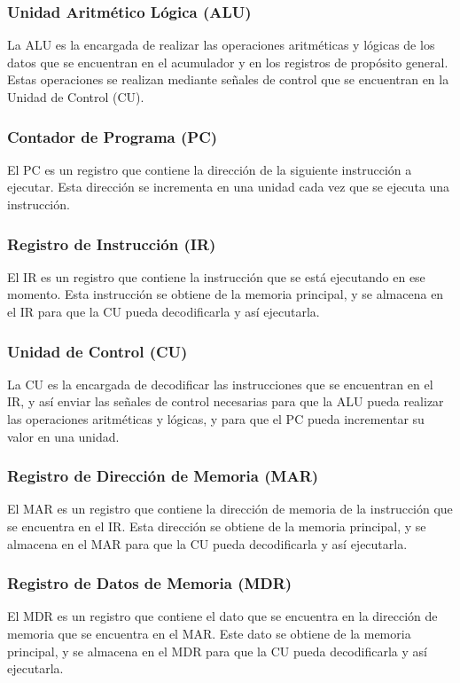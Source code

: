 \documentclass{article}
\begin{document}
\subsubsection*{Unidad Aritmético Lógica (ALU)}
La ALU es la encargada de realizar las operaciones aritm\'{e}ticas y l\'{o}gicas
de los datos que se encuentran en el acumulador y en los registros de prop\'{o}sito
general. Estas operaciones se realizan mediante se\~{n}ales de control que se
encuentran en la Unidad de Control (CU).

\subsubsection*{Contador de Programa (PC)}
El PC es un registro que contiene la direcci\'{o}n de la siguiente instrucci\'{o}n
a ejecutar. Esta direcci\'{o}n se incrementa en una unidad cada vez que se ejecuta
una instrucci\'{o}n.

\subsubsection*{Registro de Instrucción (IR)}
El IR es un registro que contiene la instrucci\'{o}n que se est\'{a} ejecutando en
ese momento. Esta instrucci\'{o}n se obtiene de la memoria principal, y se almacena
en el IR para que la CU pueda decodificarla y as\'{i} ejecutarla.

\subsubsection*{Unidad de Control (CU)}
La CU es la encargada de decodificar las instrucciones que se encuentran en el IR,
y as\'{i} enviar las se\~{n}ales de control necesarias para que la ALU pueda realizar
las operaciones aritm\'{e}ticas y l\'{o}gicas, y para que el PC pueda incrementar
su valor en una unidad.

\subsubsection*{Registro de Dirección de Memoria (MAR)}
El MAR es un registro que contiene la direcci\'{o}n de memoria de la instrucci\'{o}n
que se encuentra en el IR. Esta direcci\'{o}n se obtiene de la memoria principal, y
se almacena en el MAR para que la CU pueda decodificarla y as\'{i} ejecutarla.

\subsubsection*{Registro de Datos de Memoria (MDR)}
El MDR es un registro que contiene el dato que se encuentra en la direcci\'{o}n de
memoria que se encuentra en el MAR. Este dato se obtiene de la memoria principal, y
se almacena en el MDR para que la CU pueda decodificarla y as\'{i} ejecutarla.
\end{document}
